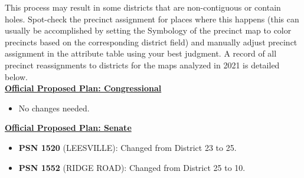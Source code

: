 \documentclass[11pt]{article}
\begin{document}
This process may result in some districts that are non-contiguous or contain holes. Spot-check the precinct assignment for places where this happens (this can usually be accomplished by setting the Symbology of the precinct map to color precincts based on the corresponding district field) and manually adjust precinct assignment in the attribute table using your best judgment. A record of all precinct reassignments to districts for the maps analyzed in 2021 is detailed below.\\

\underline{\textbf{Official Proposed Plan: Congressional}}

\begin{itemize}
	\item No changes needed.
\end{itemize}

\underline{\textbf{Official Proposed Plan: Senate}}
\begin{itemize}
	\item \textbf{PSN 1520}  (LEESVILLE): Changed from District 23 to 25.
	\item \textbf{PSN 1552} (RIDGE ROAD): Changed from District 25 to 10.
\end{itemize}
\end{document}
